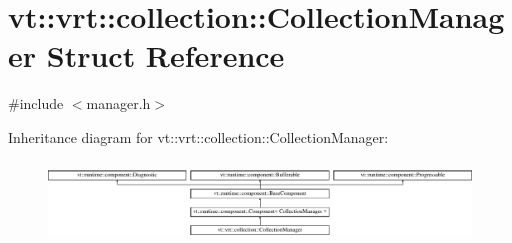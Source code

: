 \hypertarget{structvt_1_1vrt_1_1collection_1_1_collection_manager}{}\section{vt\+:\+:vrt\+:\+:collection\+:\+:Collection\+Manager Struct Reference}
\label{structvt_1_1vrt_1_1collection_1_1_collection_manager}


{\ttfamily \#include $<$manager.\+h$>$}

Inheritance diagram for vt\+:\+:vrt\+:\+:collection\+:\+:Collection\+Manager\+:\begin{figure}[H]
\begin{center}
\leavevmode
\includegraphics[height=2.170543cm]{structvt_1_1vrt_1_1collection_1_1_collection_manager}
\end{center}
\end{figure}
